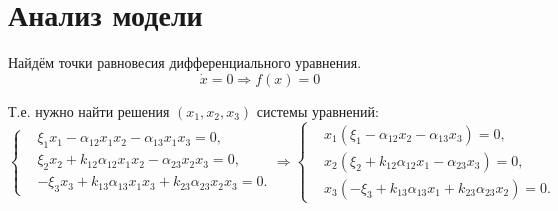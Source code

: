 \section{Анализ модели}
    Найдём точки равновесия дифференциального уравнения.
    \[
        \dot{x} = 0 \Rightarrow f(x) = 0
    \]

    Т.е. нужно найти решения \( (x_1, x_2, x_3) \) системы уравнений:
    \[
        \left\{\begin{split}
            & \xi_1 x_1 - \alpha_{12} x_1 x_2 - \alpha_{13} x_1 x_3 = 0, \\
            & \xi_2 x_2 + k_{12} \alpha_{12} x_1 x_2 - \alpha_{23} x_2 x_3 = 0, \\
            & -\xi_3 x_3 + k_{13} \alpha_{13} x_1 x_3 + k_{23} \alpha_{23} x_2 x_3 = 0. 
        \end{split}\right.
        \Rightarrow
        \left\{\begin{split}
            & x_1 (\xi_1 - \alpha_{12} x_2 - \alpha_{13} x_3) = 0, \\
            & x_2 (\xi_2 + k_{12} \alpha_{12} x_1 - \alpha_{23} x_3) = 0, \\
            & x_3 (-\xi_3 + k_{13} \alpha_{13} x_1 + k_{23} \alpha_{23} x_2) = 0. 
        \end{split}\right.
    \]


